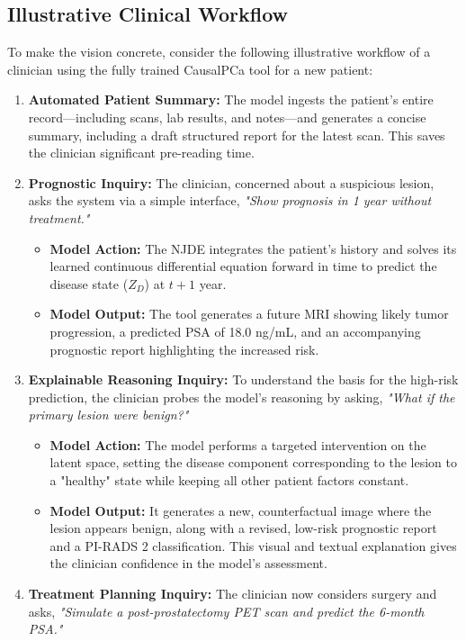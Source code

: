 \documentclass[11pt, a4paper]{article}
\begin{document}
\subsection{Illustrative Clinical Workflow}
To make the vision concrete, consider the following illustrative workflow of a clinician using the fully trained CausalPCa tool for a new patient:
\begin{enumerate}
    \item \textbf{Automated Patient Summary:} The model ingests the patient's entire record—including scans, lab results, and notes—and generates a concise summary, including a draft structured report for the latest scan. This saves the clinician significant pre-reading time.
    \item \textbf{Prognostic Inquiry:} The clinician, concerned about a suspicious lesion, asks the system via a simple interface, \textit{"Show prognosis in 1 year without treatment."}
    \begin{itemize}
        \item \textbf{Model Action:} The NJDE integrates the patient's history and solves its learned continuous differential equation forward in time to predict the disease state ($Z_D$) at $t+1$ year.
        \item \textbf{Model Output:} The tool generates a future MRI showing likely tumor progression, a predicted PSA of 18.0 ng/mL, and an accompanying prognostic report highlighting the increased risk.
    \end{itemize}
    \item \textbf{Explainable Reasoning Inquiry:} To understand the basis for the high-risk prediction, the clinician probes the model's reasoning by asking, \textit{"What if the primary lesion were benign?"}
    \begin{itemize}
        \item \textbf{Model Action:} The model performs a targeted intervention on the latent space, setting the disease component corresponding to the lesion to a "healthy" state while keeping all other patient factors constant.
        \item \textbf{Model Output:} It generates a new, counterfactual image where the lesion appears benign, along with a revised, low-risk prognostic report and a PI-RADS 2 classification. This visual and textual explanation gives the clinician confidence in the model's assessment.
    \end{itemize}
    \item \textbf{Treatment Planning Inquiry:} The clinician now considers surgery and asks, \textit{"Simulate a post-prostatectomy PET scan and predict the 6-month PSA."}

\end{enumerate}
\end{document}
